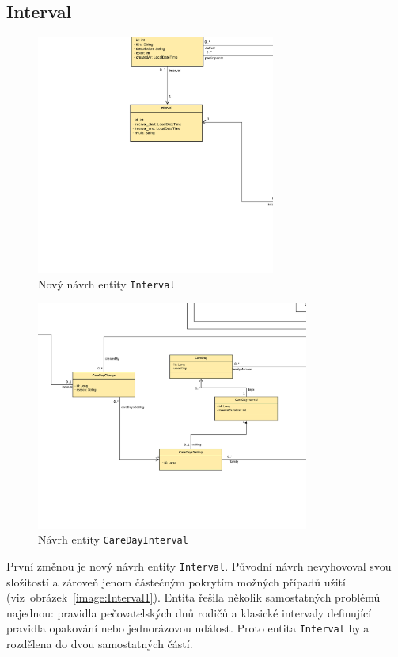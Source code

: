     \subsection{Interval}\label{navrh:upravy:interval}
        \begin{figure}\centering
	        \includegraphics[width=0.7\textwidth]{pdfs/Interval2}
	        \caption[Nový návrh entity \texttt{Interval}]{Nový návrh entity \texttt{Interval}}\label{image:Interval2}
        \end{figure}
        \begin{figure}\centering
	        \includegraphics[width=0.8\textwidth]{pdfs/CareDayInterval}
	        \caption[Návrh entity \texttt{CareDayInterval}]{Návrh entity \texttt{CareDayInterval}}\label{image:careDayInterval}
        \end{figure}
        První změnou je nový návrh entity \verb|Interval|. Původní návrh nevyhovoval svou složitostí a zároveň jenom částečným pokrytím možných případů užití (viz~obrázek~\ref{image:Interval1}). Entita řešila několik samostatných problémů najednou: pravidla pečovatelských dnů rodičů a klasické intervaly definující pravidla opakování nebo jednorázovou událost. Proto entita \verb|Interval| byla rozdělena do dvou samostatných částí.
